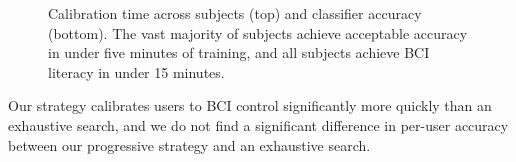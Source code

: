 \begin{figure}[!h]
  \vspace{-0.2cm}
  \centering

  
  \def\angle{0}
\def\radius{2.9}
\def\cyclelist{{"red","green","blue","yellow"}}
\newcount\cyclecount {}
\newcount\ind {}
  \vspace{0.1cm}
  
  \caption{Calibration time across subjects (top) and classifier accuracy (bottom). The vast majority of subjects achieve acceptable accuracy in under five minutes of training, and all subjects achieve BCI literacy in under 15 minutes. }
  \label{fig:calibration_results}
  \vspace{-0.1cm}
\end{figure}

Our strategy calibrates users to BCI control significantly more quickly than an exhaustive search, and we do not find a significant difference in per-user accuracy between our progressive strategy and an exhaustive search. 

